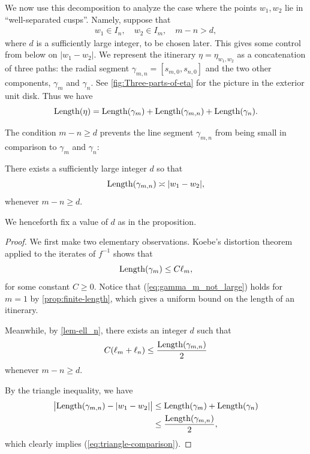 We now use this decomposition to analyze the case where the points $w_1,w_2$ lie in ``well-separated cusps''. Namely, suppose that
\begin{align} \label{parabolic separation}
	w_1 \in I_n, \quad w_2 \in I_m, \quad m-n > d,
\end{align}
where $d$ is a sufficiently large integer, to be chosen later. 
This gives some control from below on $|w_1-w_2|$. 
We represent the itinerary $\eta=\eta_{w_1,w_2}$ as a concatenation of three paths: the radial segment $\gamma_{m,n}=[s_{m,0},s_{n,0}]$ and the two other components, $\gamma _m$ and $\gamma_n$. See \cref{fig:Three-parts-of-eta} for the picture in the exterior unit disk.
Thus we have
\begin{equation}
	\operatorname{Length}(\eta)=\operatorname{Length}(\gamma_m)+\operatorname{Length}(\gamma_{m,n})+\operatorname{Length}(\gamma_n).
\end{equation}



The condition $m-n \geq d$ prevents the line segment $\gamma _{m,n}$ from being small in comparison to $\gamma_m$ and $\gamma_n$:
\begin{proposition}
\label {case-3-proof}
There exists a sufficiently large integer $d$ so that 
	\begin{equation}
	\label{eq:triangle-comparison}
		\operatorname{Length}(\gamma_{m,n}) \asymp |w_1-w_2|,
	\end{equation}
	whenever $m-n \geq d$.
\end{proposition}

We henceforth fix a value of $d$ as in the proposition.
\begin{proof}
We first make two elementary observations. Koebe's distortion theorem applied to the iterates of $f^{-1}$ shows that
\begin{equation} \label{eq:gamma_m_not_large}
		\operatorname{Length}(\gamma_m) \leq C \ell_m,
	\end{equation}
for some constant $C \geq 0$. Notice that (\ref{eq:gamma_m_not_large}) holds for $m=1$ by \cref{prop:finite-length}, which gives a uniform bound on the length of an itinerary.

Meanwhile, by \cref{lem-ell_n}, there exists an integer $d$ such that
\begin{align}
C(\ell_m + \ell _n) \leq \frac{\operatorname{Length}(\gamma_{m,n})}{2}
\end{align}
whenever $m-n \geq d$.

By the triangle inequality, we have
\begin{align*} 
		\bigl | \operatorname{Length}(\gamma_{m,n}) - |w_1-w_2| \bigr | & \le \operatorname{Length}(\gamma_m)+\operatorname{Length}(\gamma_n) \\
		& \le \frac{\operatorname{Length}(\gamma_{m,n})}{2},
\end{align*}
which clearly implies (\ref{eq:triangle-comparison}).
\end{proof}

